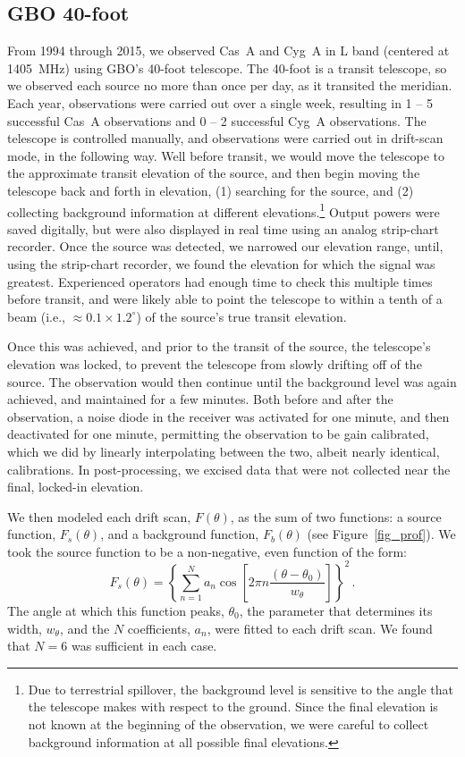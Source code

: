 \documentclass[fleqn,usenatbib]{mnras}
\begin{document}
\subsection{GBO 40-foot}\label{gbo40data}

From 1994 through 2015, we observed Cas~A and Cyg~A in L band (centered at 1405~MHz) using GBO's 40-foot telescope.  The 40-foot is a transit telescope, so we observed each source no more than once per day, as it transited the meridian.  Each year, observations were carried out over a single week, resulting in 1 -- 5 successful Cas~A observations and 0 -- 2 successful Cyg~A observations.  The telescope is controlled manually, and observations were carried out in drift-scan mode, in the following way.  Well before transit, we would move the telescope to the approximate transit elevation of the source, and then begin moving the telescope back and forth in elevation, (1) searching for the source, and (2) collecting background information at different elevations.\footnote{Due to terrestrial spillover, the background level is sensitive to the angle that the telescope makes with respect to the ground.  Since the final elevation is not known at the beginning of the observation, we were careful to collect background information at all possible final elevations.}  Output powers were saved digitally, but were also displayed in real time using an analog strip-chart recorder.  Once the source was detected, we narrowed our elevation range, until, using the strip-chart recorder, we found the elevation for which the signal was greatest.  Experienced operators had enough time to check this multiple times before transit, and were likely able to point the telescope to within a tenth of a beam (i.e., $\approx$$0.1\times1.2^\circ$) of the source's true transit elevation.

Once this was achieved, and prior to the transit of the source, the telescope's elevation was locked, to prevent the telescope from slowly drifting off of the source.  The observation would then continue until the background level was again achieved, and maintained for a few minutes.  Both before and after the observation, a noise diode in the receiver was activated for one minute, and then deactivated for one minute, permitting the observation to be gain calibrated, which we did by linearly interpolating between the two, albeit nearly identical, calibrations.  In post-processing, we excised data that were not collected near the final, locked-in elevation.

We then modeled each drift scan, $F(\theta)$, as the sum of two functions: a source function, $F_s(\theta)$, and a background function, $F_b(\theta)$ (see Figure~\ref{fig_prof}).  We took the source function to be a non-negative, even function of the form:
\begin{equation}\label{eq-profile}
F_s(\theta) = \left\{{\sum_{n=1}^{N}{a_{n}\cos\left[2\pi n\frac{\left(\theta-\theta_0\right)}{w_\theta}\right]}}\right\}^2 \, .
\end{equation}
The angle at which this function peaks, $\theta_0$, the parameter that determines its width, $w_\theta$, and the $N$ coefficients, $a_n$, were fitted to each drift scan.  We found that $N=6$ was sufficient in each case. 
\end{document}
